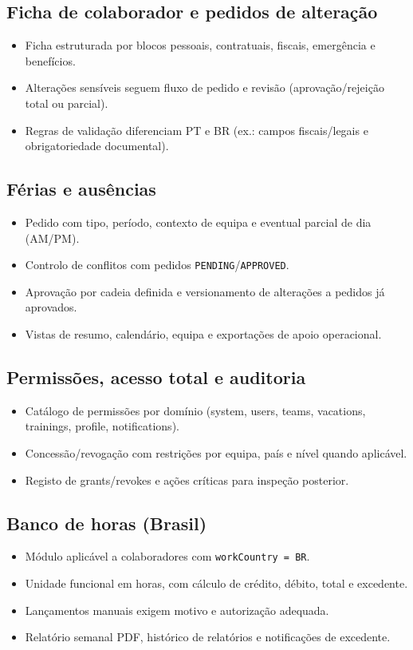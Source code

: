 \documentclass[11pt,a4paper,twoside]{article}
\begin{document}
\subsection{Ficha de colaborador e pedidos de alteração}
\begin{itemize}
  \item Ficha estruturada por blocos pessoais, contratuais, fiscais, emergência e benefícios.
  \item Alterações sensíveis seguem fluxo de pedido e revisão (aprovação/rejeição total ou parcial).
  \item Regras de validação diferenciam PT e BR (ex.: campos fiscais/legais e obrigatoriedade documental).
\end{itemize}

\subsection{Férias e ausências}
\begin{itemize}
  \item Pedido com tipo, período, contexto de equipa e eventual parcial de dia (AM/PM).
  \item Controlo de conflitos com pedidos \texttt{PENDING}/\texttt{APPROVED}.
  \item Aprovação por cadeia definida e versionamento de alterações a pedidos já aprovados.
  \item Vistas de resumo, calendário, equipa e exportações de apoio operacional.
\end{itemize}

\subsection{Permissões, acesso total e auditoria}
\begin{itemize}
  \item Catálogo de permissões por domínio (system, users, teams, vacations, trainings, profile, notifications).
  \item Concessão/revogação com restrições por equipa, país e nível quando aplicável.
  \item Registo de grants/revokes e ações críticas para inspeção posterior.
\end{itemize}

\subsection{Banco de horas (Brasil)}
\begin{itemize}
  \item Módulo aplicável a colaboradores com \texttt{workCountry = BR}.
  \item Unidade funcional em horas, com cálculo de crédito, débito, total e excedente.
  \item Lançamentos manuais exigem motivo e autorização adequada.
  \item Relatório semanal PDF, histórico de relatórios e notificações de excedente.
\end{itemize}
\end{document}

